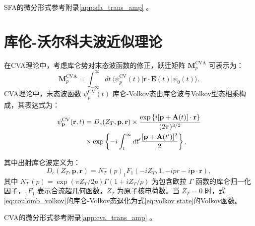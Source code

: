 SFA的微分形式参考附录\ref{app:sfa_trans_amp} 。

\section{库伦-沃尔科夫波近似理论}
在CVA理论中，考虑库仑势对末态波函数的修正，跃迁矩阵 $\mathbf{M}_p^{\text{CVA}}$ 可表示为：  
\begin{equation}  
\mathbf{M}_p^{\text{CVA}} = \int_{-\infty}^{\infty} dt \, \langle \psi_p^{\text{CV}}(t) | \mathbf{r} \cdot \mathbf{E}(t) | \psi_0(t) \rangle. \label{eq:primal M_p_cva}  
\end{equation}  
CVA理论中，末态波函数 $\psi_p^{\text{CV}}(t)$ 库仑-Volkov态由库仑波与Volkov型态相乘构成，其表达式为：  
\begin{equation}  
\begin{split}
\psi_{\mathbf{p}}^{\rm CV}(\mathbf{r},t) 
& = D_c(Z_T, \mathbf{p}, \mathbf{r}) \times \frac{\exp\left\{i[\mathbf{p} + \mathbf{A}(t)] \cdot \mathbf{r}\right\}}{(2\pi)^{3/2}} \\
& \times \exp\left\{-i \int_t^\infty dt' \frac{[\mathbf{p} + \mathbf{A}(t')]^2}{2}\right\}, \label{eq:coulomb_volkov}  
\end{split}
\end{equation}  

其中出射库仑波定义为：  
\begin{equation}  
D_c(Z_T, \mathbf{p}, \mathbf{r}) = N_T^-(p)_1 F_1(-iZ_T, 1, -ipr - i\mathbf{p} \cdot \mathbf{r}), \label{eq:outgoing wave}
\end{equation}  
其中 $N_T^-(p) = \exp(\pi Z_T/2p)\Gamma(1+iZ_T/p)$ 为包含欧拉 $\Gamma$ 函数的库仑归一化因子，$_1F_1$ 表示合流超几何函数，$Z_T$ 为原子核电荷数。当 $Z_T=0$ 时，式\eqref{eq:coulomb_volkov}的库仑-Volkov态退化为式\eqref{eq:volkov state}的Volkov函数。

CVA的微分形式参考附录\ref{app:cva_trans_amp} 。